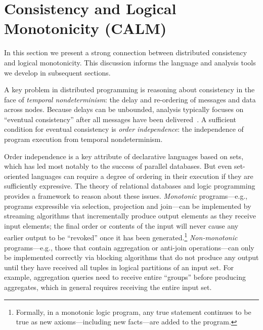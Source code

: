 \section{Consistency and Logical \\ Monotonicity (CALM)}
In this section we present a strong connection between distributed consistency and logical monotonicity.  This discussion informs the language and analysis tools we develop in subsequent sections.

A key problem in distributed programming is reasoning about consistency in the face of {\em
temporal nondeterminism}: the delay and re-ordering of messages and data across
nodes.  Because delays can be unbounded, analysis typically focuses on ``eventual consistency'' after all messages have been delivered~\cite{vogels}.  A sufficient condition for eventual consistency is {\em order independence}: the independence of program execution from temporal
nondeterminism.

Order independence is a key attribute of declarative languages based on sets, which has led most notably to the success of parallel databases.  But even set-oriented languages can require a degree of ordering in their execution if they are sufficiently expressive.
The theory of relational databases and logic programming provides a framework to reason about these issues. \emph{Monotonic} programs---e.g., programs expressible via selection, projection and join---can be implemented by streaming algorithms that incrementally produce output elements as they receive input elements; the final order or contents of the input will never cause any earlier output to be ``revoked'' once it has been generated.\footnote{Formally, in a monotonic logic program, any true statement continues to be true as new axioms---including new facts---are added to the program.}   
\emph{Non-monotonic} programs---e.g., those that contain aggregation or anti-join operations---can only be implemented correctly via blocking algorithms that do not produce any output until they have received all tuples in logical partitions of an input set. 
For example, aggregation queries need to receive entire ``groups'' before producing aggregates, which in general requires receiving the entire input set.

